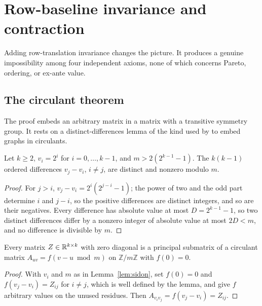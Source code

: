 \section{Row-baseline invariance and contraction}\label{sec:translations}

Adding row-translation invariance changes the picture. It produces a genuine impossibility among
four independent axioms, none of which concerns Pareto, ordering, or ex-ante value.

\subsection{The circulant theorem}

The proof embeds an arbitrary matrix in a matrix with a transitive symmetry group. It rests on a
distinct-differences lemma of the kind used by \textcite{finkruiz1986} to embed graphs in
circulants.

\begin{lemma}\label{lem:sidon}
Let $k\ge2$, $v_i=2^i$ for $i=0,\dots,k-1$, and $m>2(2^{k-1}-1)$. The $k(k-1)$ ordered differences
$v_j-v_i$, $i\ne j$, are distinct and nonzero modulo $m$.
\end{lemma}

\begin{proof}
For $j>i$, $v_j-v_i=2^i(2^{j-i}-1)$; the power of two and the odd part determine $i$ and $j-i$, so the
positive differences are distinct integers, and so are their negatives. Every difference has
absolute value at most $D=2^{k-1}-1$, so two distinct differences differ by a nonzero integer of
absolute value at most $2D<m$, and no difference is divisible by $m$.
\end{proof}

\begin{lemma}\label{lem:embed}
Every matrix $Z\in\mathbb{R}^{k\times k}$ with zero diagonal is a principal submatrix of a circulant matrix
$A_{uv}=f(v-u\bmod m)$ on $\mathbb Z/m\mathbb Z$ with $f(0)=0$.
\end{lemma}

\begin{proof}
With $v_i$ and $m$ as in Lemma~\ref{lem:sidon}, set $f(0)=0$ and $f(v_j-v_i)=Z_{ij}$ for $i\ne j$, which
is well defined by the lemma, and give $f$ arbitrary values on the unused residues. Then
$A_{v_iv_j}=f(v_j-v_i)=Z_{ij}$.
\end{proof}

